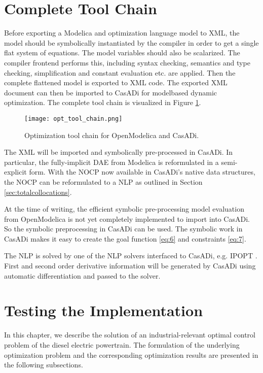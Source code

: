 \section{Complete Tool Chain}
\label{sec:optimizationtoolchain}

Before exporting a Modelica and optimization language model to XML, the model should be symbolically
instantiated by the compiler in order to get a single flat system of equations. The model variables should also be
scalarized. The compiler frontend performs this, including syntax checking, semantics and type checking, simplification
and constant evaluation etc. are applied. Then the complete flattened model is exported to XML code. The exported
XML document can then be imported to CasADi for modelbased dynamic optimization. The complete tool chain is
visualized in Figure \ref{fig:optimizationtoolchain}.

\begin{figure}
	\texttt{[image: opt\_tool\_chain.png]}
	\caption{Optimization tool chain for OpenModelica and CasADi.}
	\label{fig:optimizationtoolchain}
\end{figure}

The XML will be imported and symbolically pre-processed in CasADi. In particular, the fully-implicit DAE from
Modelica is reformulated in a semi-explicit form. With the NOCP now available in CasADi’s native data structures, the
NOCP can be reformulated to a NLP as outlined in Section \ref{sec:totalcollocations}.

At the time of writing, the efficient symbolic pre-processing model evaluation from OpenModelica is not yet completely
implemented to import into CasADi. So the symbolic preprocessing in CasADi can be used. The symbolic work in CasADi makes it easy to create the goal function \ref{eq:6} and constraints \ref{eq:7}.

The NLP is solved by one of the NLP solvers interfaced to CasADi, e.g. IPOPT \cite{wachter}. First and second order derivative information will be generated by CasADi using automatic differentiation and passed to the solver.

\section{Testing the Implementation}
\label{sec:optimizationtesting}

In this chapter, we describe the solution of an industrial-relevant optimal control problem of the diesel electric powertrain. The
formulation of the underlying optimization problem and the corresponding optimization results are presented in the
following subsections.

